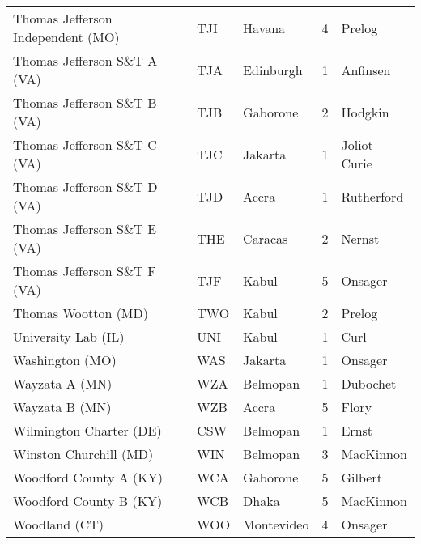 \documentclass{article}%
\begin{document}
\begin{longtable}{|ll|ll|l|}
Thomas Jefferson Independent (MO)&TJI&Havana&4&Prelog\\%
Thomas Jefferson S\&T A (VA)&TJA&Edinburgh&1&Anfinsen\\%
Thomas Jefferson S\&T B (VA)&TJB&Gaborone&2&Hodgkin\\%
Thomas Jefferson S\&T C (VA)&TJC&Jakarta&1&Joliot{-}Curie\\%
Thomas Jefferson S\&T D (VA)&TJD&Accra&1&Rutherford\\%
Thomas Jefferson S\&T E (VA)&THE&Caracas&2&Nernst\\%
Thomas Jefferson S\&T F (VA)&TJF&Kabul&5&Onsager\\%
Thomas Wootton (MD)&TWO&Kabul&2&Prelog\\%
University Lab (IL)&UNI&Kabul&1&Curl\\%
Washington (MO)&WAS&Jakarta&1&Onsager\\%
Wayzata A (MN)&WZA&Belmopan&1&Dubochet\\%
Wayzata B (MN)&WZB&Accra&5&Flory\\%
Wilmington Charter (DE)&CSW&Belmopan&1&Ernst\\%
Winston Churchill (MD)&WIN&Belmopan&3&MacKinnon\\%
Woodford County A (KY)&WCA&Gaborone&5&Gilbert\\%
Woodford County B (KY)&WCB&Dhaka&5&MacKinnon\\%
Woodland (CT)&WOO&Montevideo&4&Onsager\\%
\end{longtable}%
\end{document}
